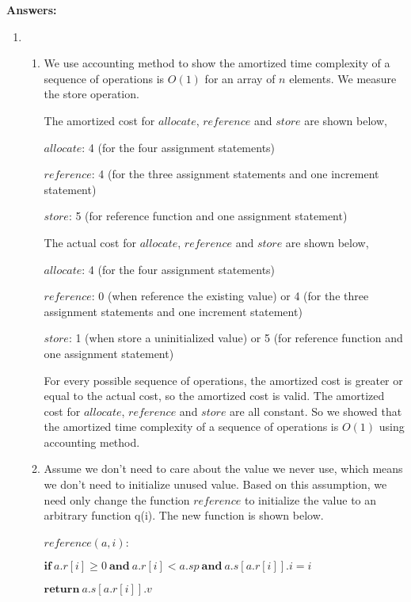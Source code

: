 \documentclass[11pt,letterpaper,oneside]{article}
\begin{document}
\noindent\textbf{Answers:}
\begin{enumerate}
\item 
\begin{enumerate}
\item We use accounting method to show the amortized time complexity of a sequence of operations is $O(1)$ for an array of $n$ elements. We measure the store operation.

The amortized cost for $allocate$, $reference$ and $store$ are shown below,

$allocate$: 4 (for the four assignment statements)

$reference$: 4 (for the three assignment statements and one increment statement)

$store$: 5 (for reference function and one assignment statement)

The actual cost for $allocate$, $reference$ and $store$ are shown below,

$allocate$: 4 (for the four assignment statements)

$reference$: 0 (when reference the existing value) or 4 (for the three assignment statements and one increment statement)

$store$: 1 (when store a uninitialized value) or 5 (for reference function and one assignment statement)

For every possible sequence of operations, the amortized cost is greater or equal to the actual cost, so the amortized cost is valid. The amortized cost for $allocate$, $reference$ and $store$ are all constant. So we showed that the amortized time complexity of a sequence of operations is $O(1)$ using accounting method.

\item Assume we don't need to care about the value we never use, which means we don't need to initialize unused value. Based on this assumption, we need only change the function $reference$ to initialize the value to an arbitrary function q(i). The new function is shown below.

\vspace{1em}\hspace{2em} $reference(a, i)$:

\hspace{3em}    $\textbf{if}\ a.r[i] \geq 0\ \textbf{and}\ a.r[i] < a.sp\ \textbf{and}\ a.s[a.r[i]].i = i$

\hspace{4em}        $\textbf{return}\ a.s[a.r[i]].v$


\end{enumerate}
\end{enumerate}
\end{document}

